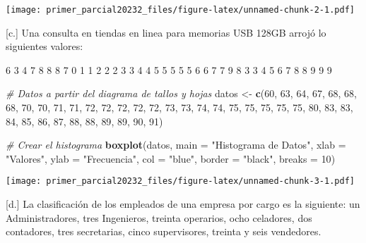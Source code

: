 \documentclass[
]{article}
\newenvironment{Shaded}{\begin{snugshade}}{\end{snugshade}}
\newcommand{\AttributeTok}[1]{\textcolor[rgb]{0.13,0.29,0.53}{#1}}
\newcommand{\CommentTok}[1]{\textcolor[rgb]{0.56,0.35,0.01}{\textit{#1}}}
\newcommand{\DecValTok}[1]{\textcolor[rgb]{0.00,0.00,0.81}{#1}}
\newcommand{\FunctionTok}[1]{\textcolor[rgb]{0.13,0.29,0.53}{\textbf{#1}}}
\newcommand{\NormalTok}[1]{#1}
\newcommand{\OtherTok}[1]{\textcolor[rgb]{0.56,0.35,0.01}{#1}}
\newcommand{\StringTok}[1]{\textcolor[rgb]{0.31,0.60,0.02}{#1}}
\begin{document}
\texttt{[image: primer\_parcial20232\_files/figure-latex/unnamed-chunk-2-1.pdf]}

{[}c.{]} Una consulta en tiendas en linea para memorias USB 128GB arrojó
lo siguientes valores:

6 3 4 7 8 8 8 7 0 1 1 2 2 2 3 3 4 4 5 5 5 5 5 6 6 7 7
9 8 3 3 4 5 6 7 8 8 9 9 9

\begin{Shaded}
\begin{Highlighting}[]
\CommentTok{\# Datos a partir del diagrama de tallos y hojas}
\NormalTok{datos }\OtherTok{\textless{}{-}} \FunctionTok{c}\NormalTok{(}\DecValTok{60}\NormalTok{, }\DecValTok{63}\NormalTok{, }\DecValTok{64}\NormalTok{, }\DecValTok{67}\NormalTok{, }\DecValTok{68}\NormalTok{, }\DecValTok{68}\NormalTok{, }\DecValTok{68}\NormalTok{, }\DecValTok{70}\NormalTok{, }\DecValTok{70}\NormalTok{, }\DecValTok{71}\NormalTok{, }\DecValTok{71}\NormalTok{, }\DecValTok{72}\NormalTok{, }\DecValTok{72}\NormalTok{, }\DecValTok{72}\NormalTok{, }\DecValTok{72}\NormalTok{, }\DecValTok{72}\NormalTok{, }\DecValTok{73}\NormalTok{, }\DecValTok{73}\NormalTok{, }\DecValTok{74}\NormalTok{, }\DecValTok{74}\NormalTok{, }\DecValTok{75}\NormalTok{, }\DecValTok{75}\NormalTok{, }\DecValTok{75}\NormalTok{, }\DecValTok{75}\NormalTok{, }\DecValTok{75}\NormalTok{, }\DecValTok{80}\NormalTok{, }\DecValTok{83}\NormalTok{, }\DecValTok{83}\NormalTok{, }\DecValTok{84}\NormalTok{, }\DecValTok{85}\NormalTok{, }\DecValTok{86}\NormalTok{, }\DecValTok{87}\NormalTok{, }\DecValTok{88}\NormalTok{, }\DecValTok{88}\NormalTok{, }\DecValTok{89}\NormalTok{, }\DecValTok{89}\NormalTok{, }\DecValTok{90}\NormalTok{, }\DecValTok{91}\NormalTok{)}

\CommentTok{\# Crear el histograma}
\FunctionTok{boxplot}\NormalTok{(datos, }\AttributeTok{main =} \StringTok{"Histograma de Datos"}\NormalTok{, }\AttributeTok{xlab =} \StringTok{"Valores"}\NormalTok{, }\AttributeTok{ylab =} \StringTok{"Frecuencia"}\NormalTok{, }\AttributeTok{col =} \StringTok{"blue"}\NormalTok{, }\AttributeTok{border =} \StringTok{"black"}\NormalTok{, }\AttributeTok{breaks =} \DecValTok{10}\NormalTok{)}
\end{Highlighting}
\end{Shaded}

\texttt{[image: primer\_parcial20232\_files/figure-latex/unnamed-chunk-3-1.pdf]}

{[}d.{]} La clasificación de los empleados de una empresa por cargo es
la siguiente: un Administradores, tres Ingenieros, treinta operarios,
ocho celadores, dos contadores, tres secretarias, cinco supervisores,
treinta y seis vendedores.
\end{document}
